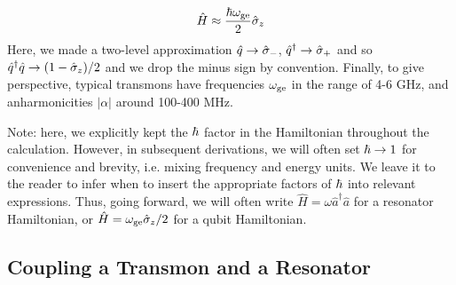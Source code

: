 \begin{equation}
    \hat{H} \approx \frac{\hbar\omega_{\rm ge}}{2}\hat{\sigma}_z
\end{equation}
Here, we made a two-level approximation $\hat{q} \to \hat{\sigma}_-$, $\hat{q}^\dagger \to \hat{\sigma}_+$ and so $\hat{q}^\dagger \hat{q} \to (1 - \hat{\sigma}_z)/2$ and we drop the minus sign by convention. Finally, to give perspective, typical transmons have frequencies $\omega_{\rm ge}$ in the range of 4-6 GHz, and anharmonicities $|\alpha|$ around 100-400 MHz. 

\noindent Note: here, we explicitly kept the $\hbar$ factor in the Hamiltonian throughout the calculation. However, in subsequent derivations, we will often set $\hbar \to 1$ for convenience and brevity, i.e. mixing frequency and energy units. We leave it to the reader to infer when to insert the appropriate factors of $\hbar$ into relevant expressions. Thus, going forward, we will often write $\hat{H} = \omega \hat{a}^\dagger\hat{a}$ for a resonator Hamiltonian, or $\hat{H} = \omega_{\rm ge}\hat{\sigma}_z/2$ for a qubit Hamiltonian. 

\subsection{Coupling a Transmon and a Resonator}

